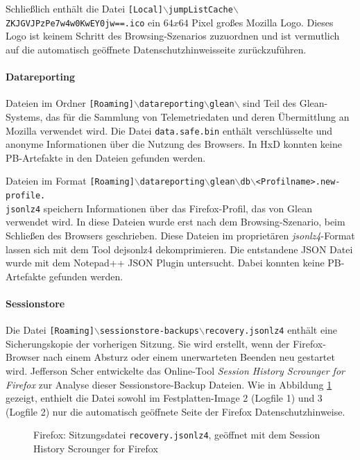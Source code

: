 \begin{appendices}
Schließlich enthält die Datei \texttt{[Local]$\backslash$jumpListCache$\backslash$ZKJGVJPzPe7w4w0KwEY0jw==.ico} ein $64x64$ Pixel großes Mozilla Logo. Dieses Logo ist keinem Schritt des Browsing-Szenarios zuzuordnen und ist vermutlich auf die automatisch geöffnete Datenschutzhinweisseite zurückzuführen.

\paragraph*{Datareporting}
Dateien im Ordner \texttt{[Roaming]$\backslash$datareporting$\backslash$glean$\backslash$} sind Teil des Glean-Systems, das für die Sammlung von Telemetriedaten und deren Übermittlung an Mozilla verwendet wird. \cite{GitHub.05.06.2023}
Die Datei \texttt{data.safe.bin} enthält verschlüsselte und anonyme Informationen über die Nutzung des Browsers. In HxD konnten keine PB-Artefakte in den Dateien gefunden werden. 

Dateien im Format \texttt{[Roaming]$\backslash$datareporting$\backslash$glean$\backslash$db$\backslash$<Profilname>.new-profile.\\jsonlz4} speichern Informationen über das Firefox-Profil, das von Glean verwendet wird. In diese Dateien wurde erst nach dem Browsing-Szenario, beim Schließen des Browsers geschrieben. Diese Dateien im proprietären \textit{jsonlz4}-Format lassen sich mit dem Tool dejsonlz4 dekomprimieren. Die entstandene JSON Datei wurde mit dem Notepad++ JSON Plugin untersucht. Dabei konnten keine PB-Artefakte gefunden werden.

\paragraph*{Sessionstore}
Die Datei \texttt{[Roaming]$\backslash$sessionstore-backups$\backslash$recovery.jsonlz4} enthält eine Sicherungskopie der vorherigen Sitzung. Sie wird erstellt, wenn der Firefox-Browser nach einem Absturz oder einem unerwarteten Beenden neu gestartet wird. 
Jefferson Scher entwickelte das Online-Tool \textit{Session History Scrounger for Firefox} zur Analyse dieser \glqq{}Sessionstore-Backup\grqq{} Dateien. \cite{JeffersonScher.29.11.2020}
Wie in Abbildung \ref{img:firefox-session-history-scrounger} gezeigt, enthielt die Datei sowohl im Festplatten-Image 2 (Logfile 1) und 3 (Logfile 2) nur die automatisch geöffnete Seite der Firefox Datenschutzhinweise.
\begin{figure}[h!]
	\caption{Firefox: Sitzungsdatei \texttt{recovery.jsonlz4}, geöffnet mit dem \glqq{}Session History Scrounger for Firefox\grqq{}}
	\label{img:firefox-session-history-scrounger}
\end{figure}


\end{appendices}
